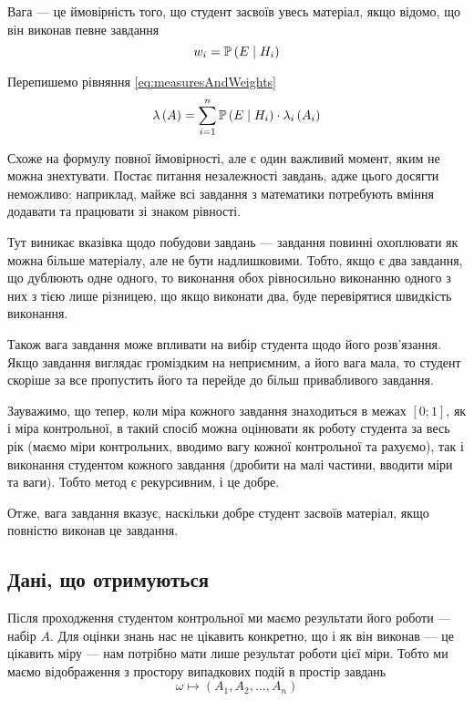 Вага --- це ймовірність того, що студент засвоїв увесь матеріал, якщо відомо, що
він виконав певне завдання
\begin{equation*}
  w_i = \mathbb{P}\left( E \;\middle|\; H_i \right)
\end{equation*}

Перепишемо рівняння \eqref{eq:measuresAndWeights}
\begin{equation*}
  \lambda\left( A \right)
  = \sum_{i=1}^{n} \mathbb{P}\left( E \;\middle|\; H_i \right) \cdot \lambda_i\left( A_i \right)
\end{equation*}

Схоже на формулу повної ймовірності, але є один важливий момент, яким не можна
знехтувати.
Постає питання незалежності завдань, адже цього досягти неможливо:
наприклад, майже всі завдання з математики потребують вміння додавати та
працювати зі знаком рівності.

Тут виникає вказівка щодо побудови завдань --- завдання повинні охоплювати
як можна більше матеріалу, але не бути надлишковими.
Тобто, якщо є два завдання, що дублюють одне одного, то виконання обох
рівносильно виконанню одного з них з тією лише різницею, що якщо виконати два,
буде перевірятися швидкість виконання.

Також вага завдання може впливати на вибір студента щодо його розв’язання.
Якщо завдання виглядає громіздким на неприємним, а його вага мала, то студент
скоріше за все пропустить його та перейде до більш привабливого завдання.

Зауважимо, що тепер, коли міра кожного завдання знаходиться в межах
$\left[ 0; 1 \right]$, як і міра контрольної, в такий спосіб можна оцінювати
як роботу студента за весь рік (маємо міри контрольних, вводимо вагу кожної
контрольної та рахуємо), так і виконання студентом кожного завдання (дробити
на малі частини, вводити міри та ваги).
Тобто метод є рекурсивним, і це добре.

Отже, вага завдання вказує, наскільки добре студент засвоїв матеріал, якщо
повністю виконав це завдання.

\subsection{Дані, що отримуються}

Після проходження студентом контрольної ми маємо результати його роботи ---
набір $A$.
Для оцінки знань нас не цікавить конкретно, що і як він виконав --- це цікавить
міру --- нам потрібно мати лише результат роботи цієї міри.
Тобто ми маємо відображення з простору випадкових подій в простір завдань
\begin{equation*}
  \omega \mapsto \left( A_1, A_2, \dots, A_n \right)
\end{equation*}


